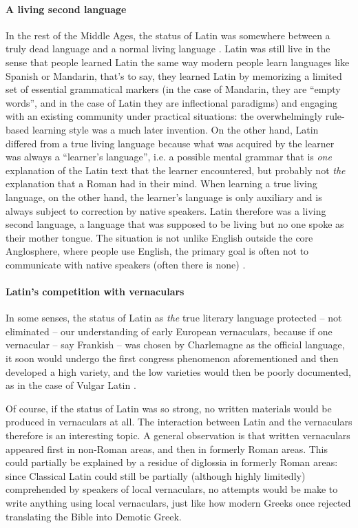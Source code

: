 \documentclass[a4paper, oneside, 12pt]{report}
\newcommand*{\citepage}[1]{p.~{#1}}
\newcommand*{\citepages}[1]{pp.~{#1}}
\begin{document}
\paragraph*{A living second language}
In the rest of the Middle Ages,
the status of Latin was somewhere between a truly dead language and a normal living language
\citep[\citepage{145-150}]{leonhardt2013latin}.
Latin was still live in the sense that
people learned Latin the same way modern people learn languages like Spanish or Mandarin,
that's to say, they learned Latin by memorizing a limited set of essential grammatical markers
(in the case of Mandarin, they are ``empty words'',
and in the case of Latin they are inflectional paradigms)
and engaging with an existing community under practical situations:
the overwhelmingly rule-based learning style was a much later invention.
On the other hand, Latin differed from a true living language
because what was acquired by the learner was always a ``learner's language'',
i.e. a possible mental grammar that is \emph{one} explanation 
of the Latin text that the learner encountered,
but probably not \emph{the} explanation that a Roman had in their mind.
When learning a true living language, on the other hand,
the learner's language is only auxiliary and is always subject to correction by native speakers.
Latin therefore was a living second language,
a language that was supposed to be living but no one spoke as their mother tongue.
The situation is not unlike English outside the core Anglosphere,
where people use English, the primary goal is often not to communicate with native speakers 
(often there is none)
\citep[\citepages{150-154}]{leonhardt2013latin}.

\paragraph*{Latin's competition with vernaculars}
In some senses, the status of Latin as \emph{the} true literary language
protected -- not eliminated -- our understanding of early European vernaculars,
because if one vernacular -- say Frankish -- was chosen by Charlemagne as the official language,
it soon would undergo the first congress phenomenon aforementioned
and then developed a high variety,
and the low varieties would then be poorly documented,
as in the case of Vulgar Latin
\citep[\citepages{143-144}]{leonhardt2013latin}.

Of course, if the status of Latin was so strong,
no written materials would be produced in vernaculars at all.
The interaction between Latin and the vernaculars therefore is an interesting topic.
A general observation is that written vernaculars appeared first in non-Roman areas,
and then in formerly Roman areas.
This could partially be explained by a residue of diglossia in formerly Roman areas:
since Classical Latin could still be partially (although highly limitedly) comprehended 
by speakers of local vernaculars,
no attempts would be make to write anything using local vernaculars,
just like how modern Greeks once rejected translating the Bible into Demotic Greek.
\end{document}
